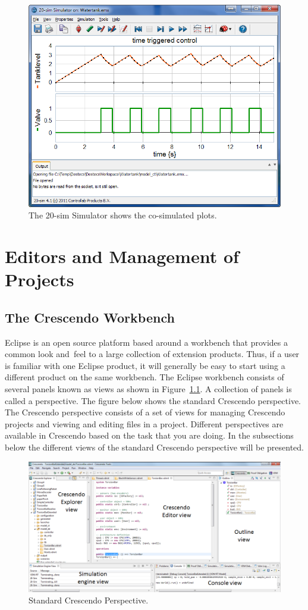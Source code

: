 \documentclass{crescendorepchap}
\begin{document}
\begin{figure}[htbp]
\centering
\includegraphics[width=.6\textwidth]{images/20simSimulatorWaterTank.png}
\caption{The 20-sim Simulator shows the co-simulated plots.\label{fig:watercosimplot}}
\end{figure}

\chapter{Editors and Management of Projects}\label{chap:basic}

\section{The Crescendo Workbench}\label{sec:crescendo}

Eclipse is an open source platform based around a workbench that
provides a common look and~feel to a large collection of extension
products. Thus, if a user is familiar with one Eclipse product, it will
generally be easy to start using a different product on the same
workbench. The Eclipse workbench consists of several panels known as
views as shown in Figure~\ref{fig:DestecsStartScreen}. 
A collection of panels is called a perspective. The figure below
shows the standard Crescendo perspective. The Crescendo perspective consists
of a set of views for managing Crescendo projects and viewing and editing
files in a project. Different perspectives are available in Crescendo
based on the task that you are doing. In the subsections below the different views of the standard Crescendo perspective will be presented.

\begin{figure}[htbp]
\centering
\includegraphics[width=.8\textwidth]{images/DestecsWorkbenchOutline.png}
\caption{Standard Crescendo Perspective.\label{fig:DestecsStartScreen}}
\end{figure}
\end{document}
